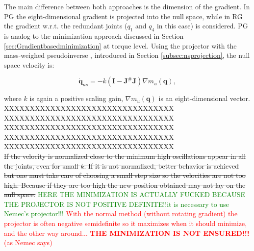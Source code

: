 The main difference between both approaches is the dimension of the gradient.  In PG the eight-dimensional gradient is projected into the null space, while in RG the gradient w.r.t. the redundant joints ($q_1$ and $q_4$ in this case) is considered.
PG is analog to the minimization approach discussed in Section \ref{sec:Gradientbasedminimization} at torque level. Using the projector  with the mass-weighed pseudoinverse \cite{khatib1995}, introduced in Section \ref{subsec:nsprojection}, the null space velocity is:

\begin{equation}
\mathbf{\dot{q}}_{ns} =  - k (\mathbf{I} -  \mathbf{J}^{\#} \mathbf{J} ) \nabla m_u(\mathbf{q}), \label{eq:RG_dq}
\end{equation}

where  $k$ is again a positive scaling gain,  $\nabla m_u(\mathbf{q})$ is an eight-dimensional vector.
 \\

XXXXXXXXXXXXXXXXXXXXXXXXXXXXXXXXX\\
XXXXXXXXXXXXXXXXXXXXXXXXXXXXXXXXX\\
XXXXXXXXXXXXXXXXXXXXXXXXXXXXXXXXX\\
XXXXXXXXXXXXXXXXXXXXXXXXXXXXXXXXX\\
XXXXXXXXXXXXXXXXXXXXXXXXXXXXXXXXX\\

\st{ If the velocity is normalized close to the minimum high oscillations appear in all the joints, even for small $k$. If it is not normalized, better behavior is achieved but one must take care of choosing a small step size so the velocities are not too high. Because if they are too high the new position obtained may not lay on the null space.} \textcolor{green}{ HERE THE MINIMIZATION IS ACTUALLY FUCKED BECAUSE THE PROJECTOR IS NOT POSITIVE DEFINITE!!it is necessary to use Nemec's projector!!!} \textcolor{red}{With the normal method (without rotating gradient) the projector is often negative semidefinite so it maximizes when it should minimize, and the other way around... \textbf{THE MINIMIZATION IS NOT ENSURED!!!}(as Nemec says)}


